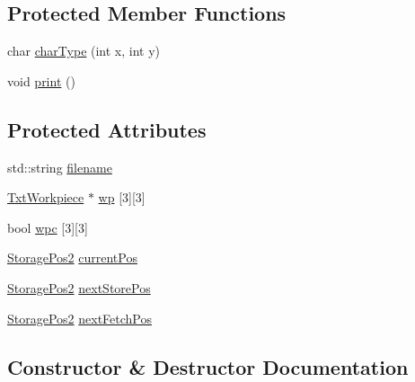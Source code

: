 \subsection*{Protected Member Functions}
\begin{DoxyCompactItemize}
\item 
char \hyperlink{classft_1_1_txt_high_bay_warehouse_storage_a878b882237dcc676f449e61a046cc198}{char\+Type} (int x, int y)
\item 
void \hyperlink{classft_1_1_txt_high_bay_warehouse_storage_a725e3c1db6fd7c4c62fcce29bb0f8af1}{print} ()
\end{DoxyCompactItemize}
\subsection*{Protected Attributes}
\begin{DoxyCompactItemize}
\item 
std\+::string \hyperlink{classft_1_1_txt_high_bay_warehouse_storage_abef4ef4c07a402eb3684969f445d509a}{filename}
\item 
\hyperlink{classft_1_1_txt_workpiece}{Txt\+Workpiece} $\ast$ \hyperlink{classft_1_1_txt_high_bay_warehouse_storage_a0e026759b179c44a78e642b338ab8694}{wp} \mbox{[}3\mbox{]}\mbox{[}3\mbox{]}
\item 
bool \hyperlink{classft_1_1_txt_high_bay_warehouse_storage_a0a570d0460997c823a04d990f08fae6f}{wpc} \mbox{[}3\mbox{]}\mbox{[}3\mbox{]}
\item 
\hyperlink{structft_1_1_storage_pos2}{Storage\+Pos2} \hyperlink{classft_1_1_txt_high_bay_warehouse_storage_a15060d4d72967a38ecd0a4348c671c3d}{current\+Pos}
\item 
\hyperlink{structft_1_1_storage_pos2}{Storage\+Pos2} \hyperlink{classft_1_1_txt_high_bay_warehouse_storage_a286ac2c5d0e3aaa944bf770725c1ac7c}{next\+Store\+Pos}
\item 
\hyperlink{structft_1_1_storage_pos2}{Storage\+Pos2} \hyperlink{classft_1_1_txt_high_bay_warehouse_storage_a46a776c37667a3f107fd1e78354e71d9}{next\+Fetch\+Pos}
\end{DoxyCompactItemize}


\subsection{Constructor \& Destructor Documentation}
